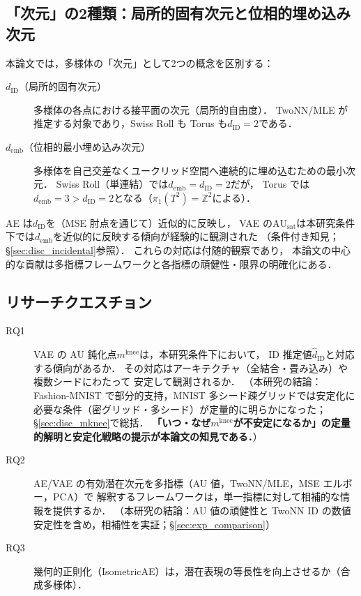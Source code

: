 \documentclass[11pt,a4paper]{jsarticle}
\newcommand{\dID}{d_{\mathrm{ID}}}
\newcommand{\AUsat}{\mathrm{AU}_{\mathrm{sat}}}
\newcommand{\mknee}{m^{\mathrm{knee}}}
\newcommand{\demb}{d_{\mathrm{emb}}}
\begin{document}
\subsection{「次元」の2種類：局所的固有次元と位相的埋め込み次元}\label{sec:intro_dim}

本論文では，多様体の「次元」として2つの概念を区別する：

\begin{description}
  \item[$\dID$（局所的固有次元）]
        多様体の各点における接平面の次元（局所的自由度）．
        TwoNN/MLE が推定する対象であり，Swiss Roll も Torus も$\dID = 2$である．
  \item[$\demb$（位相的最小埋め込み次元）]
        多様体を自己交差なくユークリッド空間へ連続的に埋め込むための最小次元．
        Swiss Roll（単連結）では$\demb = \dID = 2$だが，
        Torus では$\demb = 3 > \dID = 2$となる（$\pi_1(T^2) = \mathbb{Z}^2$による）．
\end{description}

AE は$\dID$を（MSE 肘点を通じて）近似的に反映し，
VAE の$\AUsat$は本研究条件下では$\demb$を近似的に反映する傾向が経験的に観測された
（条件付き知見；§\ref{sec:disc_incidental}参照）．
これらの対応は付随的観察であり，
本論文の中心的な貢献は多指標フレームワークと各指標の頑健性・限界の明確化にある．

\subsection{リサーチクエスチョン}\label{sec:intro_rq}

\begin{description}
  \item[RQ1] VAE の AU 鈍化点$\mknee$は，本研究条件下において，
             ID 推定値$\hat{d}_\mathrm{ID}$と対応する傾向があるか．
             その対応はアーキテクチャ（全結合・畳み込み）や複数シードにわたって
             安定して観測されるか．
             （本研究の結論：Fashion-MNIST で部分的支持，MNIST 多シード疎グリッドでは安定化に必要な条件（密グリッド・多シード）が定量的に明らかになった；
             §\ref{sec:disc_mknee}で総括．
             \textbf{「いつ・なぜ$\mknee$が不安定になるか」の定量的解明と安定化戦略の提示が本論文の知見である．}）
  \item[RQ2] AE/VAE の有効潜在次元を多指標（AU 値，TwoNN/MLE，MSE エルボー，PCA）で
             解釈するフレームワークは，単一指標に対して相補的な情報を提供するか．
             （本研究の結論：AU 値の頑健性と TwoNN ID の数値安定性を含め，相補性を実証；§\ref{sec:exp_comparison}）
  \item[RQ3] 幾何的正則化（IsometricAE）は，潜在表現の等長性を向上させるか（合成多様体）．
\end{description}
\end{document}
